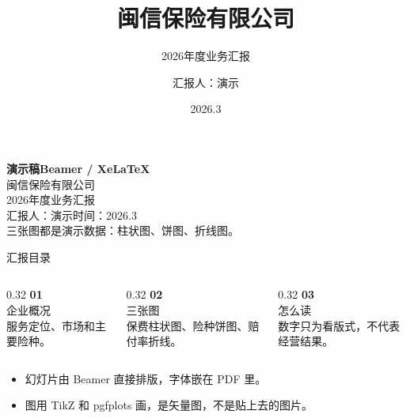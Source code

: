 \documentclass[aspectratio=169,12pt]{beamer}
\title{闽信保险有限公司}
\subtitle{2026年度业务汇报}
\author{汇报人：演示}
\date{2026.3}
\begin{document}
\begin{frame}[plain]
  \vspace{1.35cm}
  {\color{mx}\bfseries\footnotesize 演示稿\quad Beamer / XeLaTeX}\\[0.7em]
  {闽信保险有限公司}\\[0.35em]
  {\Large 2026年度业务汇报}\\[1.1em]
  {\color{muted}汇报人：演示\quad 时间：2026.3}\\[1.6em]
  {\color{ink}三张图都是演示数据：柱状图、饼图、折线图。}
\end{frame}

\begin{frame}{汇报目录}
  \begin{columns}[T,onlytextwidth]
    \begin{column}{0.32\textwidth}
      \textcolor{mx}{\bfseries 01}\\[0.3em]
      {\large 企业概况}\\[0.45em]
      {\small\color{muted}服务定位、市场和主要险种。}
    \end{column}
    \begin{column}{0.32\textwidth}
      \textcolor{mx}{\bfseries 02}\\[0.3em]
      {\large 三张图}\\[0.45em]
      {\small\color{muted}保费柱状图、险种饼图、赔付率折线。}
    \end{column}
    \begin{column}{0.32\textwidth}
      \textcolor{mx}{\bfseries 03}\\[0.3em]
      {\large 怎么读}\\[0.45em]
      {\small\color{muted}数字只为看版式，不代表经营结果。}
    \end{column}
  \end{columns}
  \vspace{1.3em}
  \begin{itemize}
    \item 幻灯片由 Beamer 直接排版，字体嵌在 PDF 里。
    \item 图用 TikZ 和 pgfplots 画，是矢量图，不是贴上去的图片。
  \end{itemize}
\end{frame}
\end{document}
